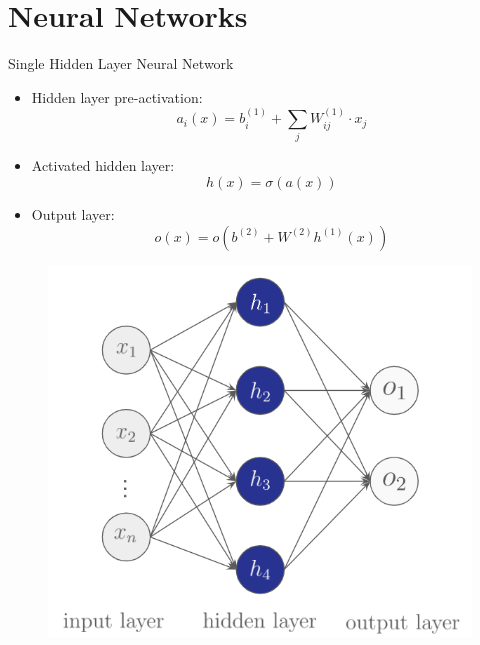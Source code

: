 \documentclass[serif, aspectratio=169]{beamer}
\begin{document}
\section{Neural Networks}
\begin{frame}{Single Hidden Layer Neural Network}
    \begin{itemize}
        \item Hidden layer pre-activation:
        $$a_i(x) = b^{(1)}_i + \sum_j W^{(1)}_{ij} \cdot x_j$$
        \item Activated hidden layer:
        $$h(x) = \sigma(a(x))$$
        \item Output layer:
        $$ o(x) = o\left(b^{(2)} + W^{(2)}h^{(1)}(x) \right) $$
    \end{itemize}
    \endminipage
    \hfill
        \begin{figure}[bh]
            \includegraphics[width=\linewidth]{pic/2/single-hidden_nn.png}
        \end{figure}
    \endminipage
\end{frame}
\end{document}
